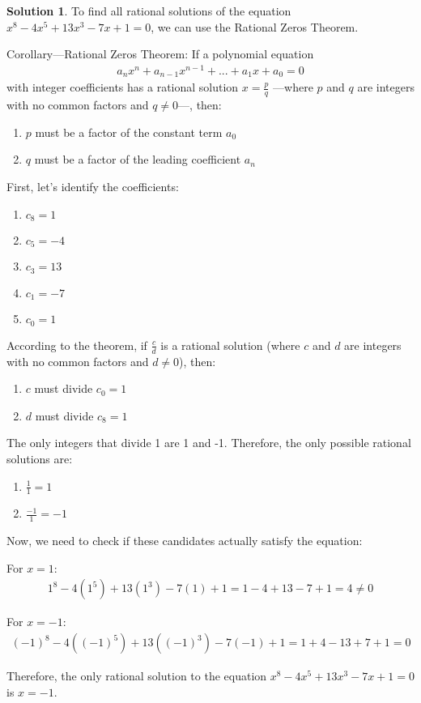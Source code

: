 \documentclass[12pt]{article}
\theoremstyle{definition} %
\newtheorem{solution}{Solution}
\theoremstyle{plain} %
\begin{document}
\begin{solution}
    To find all rational solutions of the equation $x^8-4x^5+13x^3-7x+1=0$, we can use the Rational Zeros Theorem.

Corollary—Rational Zeros Theorem: If a polynomial equation 
\begin{align}
a_nx^n + a_{n-1}x^{n-1} + ... + a_1x + a_0 = 0
\end{align}
with integer coefficients has a rational solution $x = \frac{p}{q}$ 
—where $p$ and $q$ are integers with no common factors and $q \neq 0$—, then:
\begin{enumerate}
    \item $p$ must be a factor of the constant term $a_0$
    \item $q$ must be a factor of the leading coefficient $a_n$
\end{enumerate}

First, let's identify the coefficients:
\begin{enumerate}
    \item $c_8 = 1$
    \item $c_5 = -4$
    \item $c_3 = 13$
    \item $c_1 = -7$
    \item $c_0 = 1$
\end{enumerate}

According to the theorem, if $\frac{c}{d}$ is a rational solution (where $c$ and $d$ are integers with no common factors and $d \neq 0$), then:
\begin{enumerate}
    \item $c$ must divide $c_0 = 1$
    \item $d$ must divide $c_8 = 1$
\end{enumerate}

The only integers that divide 1 are 1 and -1. Therefore, the only possible rational solutions are:
\begin{enumerate}
    \item $\frac{1}{1} = 1$
    \item $\frac{-1}{1} = -1$
\end{enumerate}

Now, we need to check if these candidates actually satisfy the equation:

For $x = 1$:
\begin{align}
1^8 - 4(1^5) + 13(1^3) - 7(1) + 1 = 1 - 4 + 13 - 7 + 1 = 4 \neq 0
\end{align}

For $x = -1$:
\begin{align}
(-1)^8 - 4((-1)^5) + 13((-1)^3) - 7(-1) + 1 = 1 + 4 - 13 + 7 + 1 = 0
\end{align}

Therefore, the only rational solution to the equation $x^8-4x^5+13x^3-7x+1=0$ is $x = -1$.
\end{solution}
\end{document}
